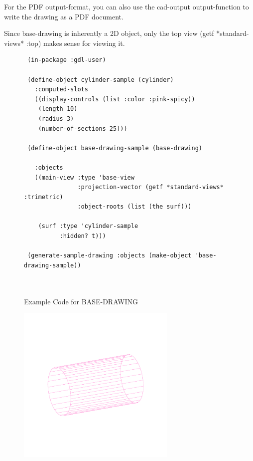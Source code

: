 \documentclass [11pt]{book}
\begin{document}
\begin{itemize}
\begin{description}
For the PDF output-format, you can also use the cad-output output-function to write the 
drawing as a PDF document. 

Since base-drawing is inherently a 2D object, only the top view (getf *standard-views* :top) 
makes sense for viewing it.



\end{description}




\begin{figure}
\begin{lrbox}{\boxedverb}
\begin{minipage}{\linewidth}
{\small

\begin{verbatim}
 (in-package :gdl-user)

 (define-object cylinder-sample (cylinder)
   :computed-slots
   ((display-controls (list :color :pink-spicy))
    (length 10)
    (radius 3)
    (number-of-sections 25)))

 (define-object base-drawing-sample (base-drawing)
  
   :objects
   ((main-view :type 'base-view
               :projection-vector (getf *standard-views* :trimetric)
               :object-roots (list (the surf)))
 
    (surf :type 'cylinder-sample
          :hidden? t))) 

 (generate-sample-drawing :objects (make-object 'base-drawing-sample))                

 
\end{verbatim}}
\end{minipage}
\end{lrbox}
\fbox{\usebox{\boxedverb}}

\caption{Example Code for BASE-DRAWING}

\label{fig:example-code-BASE-DRAWING}

\end{figure}

\begin{figure}
\begin{center}
\includegraphics[width=3in,height=3in]{../images/example-BASE-DRAWING.pdf}
\end{center}


\end{figure}
\end{itemize}
\end{document}
